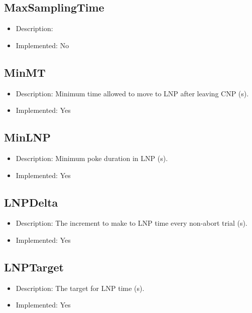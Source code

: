 \subsection*{MaxSamplingTime}
\begin{itemize}
	\item Description: 
	\item Implemented: No
\end{itemize}

\subsection*{MinMT}
\begin{itemize}
	\item Description: Minimum time allowed to move to LNP after leaving CNP (s).
	\item Implemented: Yes
\end{itemize}

\subsection*{MinLNP}
\begin{itemize}
	\item Description: Minimum poke duration in LNP (s).
	\item Implemented: Yes
\end{itemize}

\subsection*{LNPDelta}
\begin{itemize}
	\item Description: The increment to make to LNP time every non-abort trial (s).
	\item Implemented: Yes
\end{itemize}

\subsection*{LNPTarget}
\begin{itemize}
	\item Description: The target for LNP time (s).
	\item Implemented: Yes
\end{itemize}


